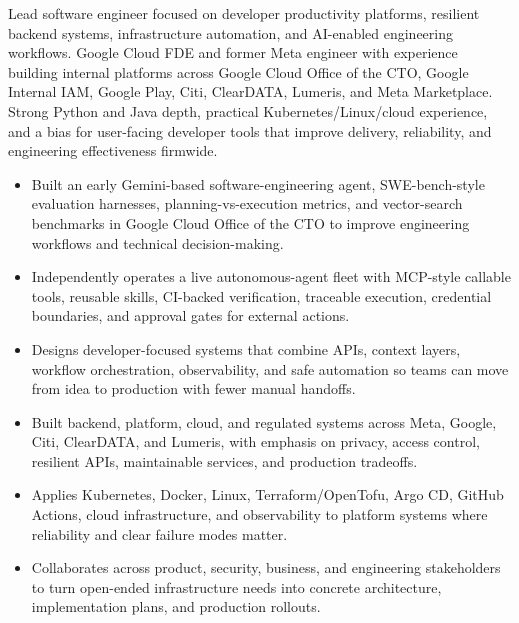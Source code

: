 


Lead software engineer focused on developer productivity platforms, resilient backend systems, infrastructure automation, and AI-enabled engineering workflows. Google Cloud FDE and former Meta engineer with experience building internal platforms across Google Cloud Office of the CTO, Google Internal IAM, Google Play, Citi, ClearDATA, Lumeris, and Meta Marketplace. Strong Python and Java depth, practical Kubernetes/Linux/cloud experience, and a bias for user-facing developer tools that improve delivery, reliability, and engineering effectiveness firmwide.
\begin{itemize}
  \item Built an early Gemini-based software-engineering agent, SWE-bench-style evaluation harnesses, planning-vs-execution metrics, and vector-search benchmarks in Google Cloud Office of the CTO to improve engineering workflows and technical decision-making.
  \item Independently operates a live autonomous-agent fleet with MCP-style callable tools, reusable skills, CI-backed verification, traceable execution, credential boundaries, and approval gates for external actions.
  \item Designs developer-focused systems that combine APIs, context layers, workflow orchestration, observability, and safe automation so teams can move from idea to production with fewer manual handoffs.
\end{itemize}
\begin{itemize}
  \item Built backend, platform, cloud, and regulated systems across Meta, Google, Citi, ClearDATA, and Lumeris, with emphasis on privacy, access control, resilient APIs, maintainable services, and production tradeoffs.
  \item Applies Kubernetes, Docker, Linux, Terraform/OpenTofu, Argo CD, GitHub Actions, cloud infrastructure, and observability to platform systems where reliability and clear failure modes matter.
  \item Collaborates across product, security, business, and engineering stakeholders to turn open-ended infrastructure needs into concrete architecture, implementation plans, and production rollouts.
\end{itemize}




